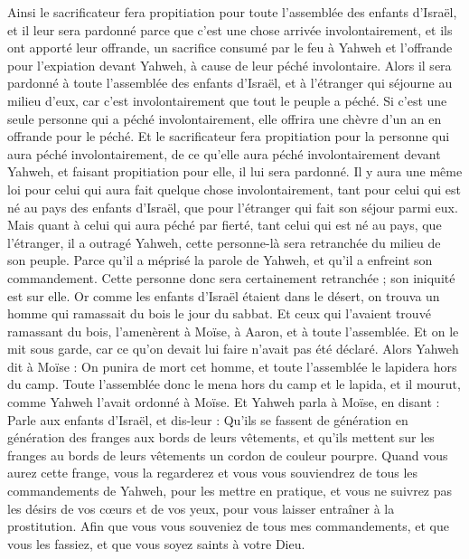 \begin{multicols}{2}
Ainsi le sacrificateur fera propitiation pour toute l'assemblée des enfants d'Israël, et il leur sera pardonné parce que c’est une chose arrivée involontairement, et ils ont apporté leur offrande, un sacrifice consumé par le feu à Yahweh et l'offrande pour l'expiation devant Yahweh, à cause de leur péché involontaire.
Alors il sera pardonné à toute l'assemblée des enfants d'Israël, et à l'étranger qui séjourne au milieu d'eux, car c'est involontairement que tout le peuple a péché.
Si c'est une seule personne qui a péché involontairement, elle offrira une chèvre d'un an en offrande pour le péché.
Et le sacrificateur fera propitiation pour la personne qui aura péché involontairement, de ce qu'elle aura péché involontairement devant Yahweh, et faisant propitiation pour elle, il lui sera pardonné.
Il y aura une même loi pour celui qui aura fait quelque chose involontairement, tant pour celui qui est né au pays des enfants d’Israël, que pour l’étranger qui fait son séjour parmi eux.
Mais quant à celui qui aura péché par fierté, tant celui qui est né au pays, que l’étranger, il a outragé Yahweh, cette personne-là sera retranchée du milieu de son peuple.
Parce qu’il a méprisé la parole de Yahweh, et qu’il a enfreint son commandement. Cette personne donc sera certainement retranchée ; son iniquité est sur elle.
Or comme les enfants d'Israël étaient dans le désert, on trouva un homme qui ramassait du bois le jour du sabbat.
Et ceux qui l'avaient trouvé ramassant du bois, l'amenèrent à Moïse, à Aaron, et à toute l'assemblée.
Et on le mit sous garde, car ce qu'on devait lui faire n'avait pas été déclaré.
Alors Yahweh dit à Moïse : On punira de mort cet homme, et toute l'assemblée le lapidera hors du camp.
Toute l'assemblée donc le mena hors du camp et le lapida, et il mourut, comme Yahweh l'avait ordonné à Moïse.
Et Yahweh parla à Moïse, en disant :
Parle aux enfants d'Israël, et dis-leur : Qu'ils se fassent de génération en génération des franges aux bords de leurs vêtements, et qu'ils mettent sur les franges au bords de leurs vêtements un cordon de couleur pourpre.
Quand vous aurez cette frange, vous la regarderez et vous vous souviendrez de tous les commandements de Yahweh, pour les mettre en pratique, et vous ne suivrez pas les désirs de vos cœurs et de vos yeux, pour vous laisser entraîner à la prostitution.
Afin que vous vous souveniez de tous mes commandements, et que vous les fassiez, et que vous soyez saints à votre Dieu.

\end{multicols}
